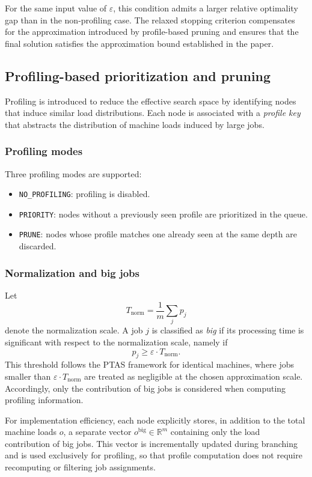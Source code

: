 For the same input value of \(\varepsilon\), this condition admits a larger relative optimality gap than in the non-profiling case.
The relaxed stopping criterion compensates for the approximation introduced by profile-based pruning and ensures that the final solution satisfies the approximation bound established in the paper.

\subsection{Profiling-based prioritization and pruning}
\label{subsec:profiling}

Profiling is introduced to reduce the effective search space by identifying nodes that induce similar load distributions.
Each node is associated with a \emph{profile key} that abstracts the distribution of machine loads induced by large jobs.

\subsubsection{Profiling modes}

Three profiling modes are supported:
\begin{itemize}
  \item \texttt{NO\_PROFILING}: profiling is disabled.
  \item \texttt{PRIORITY}: nodes without a previously seen profile are prioritized in the queue.
  \item \texttt{PRUNE}: nodes whose profile matches one already seen at the same depth are discarded.
\end{itemize}

\subsubsection{Normalization and big jobs}
\label{subsubsec:big-jobs}

Let
\[
  T_{\text{norm}} = \frac{1}{m} \sum_j p_j
\]
denote the normalization scale.
A job \(j\) is classified as \emph{big} if its processing time is significant with respect to the normalization scale, namely if
\[
  p_j \ge \varepsilon \cdot T_{\text{norm}}.
\]
This threshold follows the PTAS framework for identical machines, where jobs smaller than \(\varepsilon \cdot T_{\text{norm}}\) are treated as negligible at the chosen approximation scale.
Accordingly, only the contribution of big jobs is considered when computing profiling information.

For implementation efficiency, each node explicitly stores, in addition to the total machine loads \(o\), a separate vector \(o^{\text{big}} \in \mathbb{R}^m\) containing only the load contribution of big jobs.
This vector is incrementally updated during branching and is used exclusively for profiling, so that profile computation does not require recomputing or filtering job assignments.

